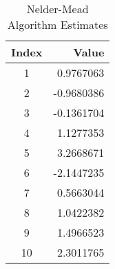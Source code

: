 \documentclass{article}
\begin{document}
\begin{table}[htbp]
\centering
\caption{Nelder-Mead Algorithm Estimates}
\begin{tabular}{cr}
\hline
Index & Value \\
\hline
1 & 0.9767063 \\
2 & -0.9680386 \\
3 & -0.1361704 \\
4 & 1.1277353 \\
5 & 3.2668671 \\
6 & -2.1447235 \\
7 & 0.5663044 \\
8 & 1.0422382 \\
9 & 1.4966523 \\
10 & 2.3011765 \\
\hline
\end{tabular}
\end{table}
\end{document}
